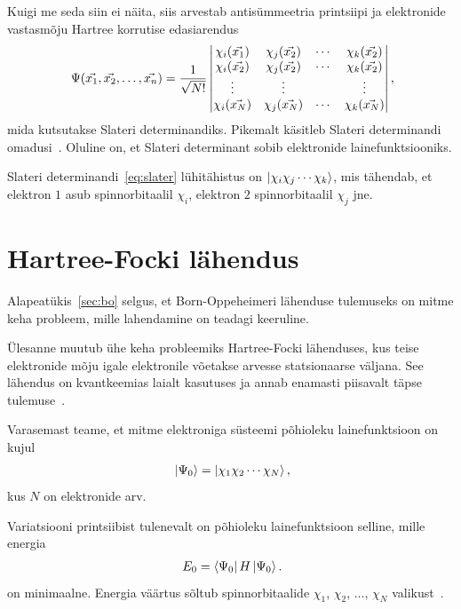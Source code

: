 \documentclass[12pt]{report}
\def\ket#1{\mathinner{|#1\rangle}}
\def\bra#1{\mathinner{\langle#1|}}
\begin{document}
Kuigi me seda siin ei näita, siis arvestab antisümmeetria printsiipi ja elektronide vastasmõju Hartree korrutise edasiarendus
\begin{align}\label{eq:slater}
    \Psi(\vec{x_1}, \vec{x_2}, \ldots, \vec{x_n})
    = \frac{1}{\sqrt{N!}} \begin{vmatrix}
        \chi_i(\vec{x_1}) & \chi_j(\vec{x_2}) & \cdots & \chi_k(\vec{x_2}) \\
        \chi_i(\vec{x_2}) & \chi_j(\vec{x_2}) & \cdots & \chi_k(\vec{x_2}) \\
        \vdots & \vdots & & \vdots \\
        \chi_i(\vec{x_N}) & \chi_j(\vec{x_N}) & \cdots & \chi_k(\vec{x_N}) \\
    \end{vmatrix} \rlap{,}
\end{align}
mida kutsutakse Slateri determinandiks.
Pikemalt käsitleb Slateri determinandi omadusi~\cite{szabo+ostlund}.
Oluline on, et Slateri determinant sobib elektronide lainefunktsiooniks.

Slateri determinandi~\eqref{eq:slater} lühitähistus on \(\ket{\chi_i\chi_j\cdots\chi_k}\), mis tähendab, et elektron \(1\) asub spinnorbitaalil \(\chi_i\), elektron \(2\) spinnorbitaalil \(\chi_j\) jne.

\section{Hartree-Focki lähendus}\label{sec:hf}

Alapeatükis~\ref{sec:bo} selgus, et Born-Oppeheimeri lähenduse tulemuseks on mitme keha probleem, mille lahendamine on teadagi keeruline.

Ülesanne muutub ühe keha probleemiks Hartree-Focki lähenduses, kus teise elektronide mõju igale elektronile võetakse arvesse statsionaarse väljana.
See lähendus on kvantkeemias laialt kasutuses ja annab enamasti piisavalt täpse tulemuse~\cite{szabo+ostlund}.

Varasemast teame, et mitme elektroniga süsteemi põhioleku lainefunktsioon on kujul
\begin{align}
    \ket{\Psi_0} = \ket{\chi_1 \chi_2 \cdots \chi_N} \rlap{,}
\end{align}
kus \(N\) on elektronide arv.

Variatsiooni printsiibist tulenevalt on põhioleku lainefunktsioon selline, mille energia
\begin{align}
    E_0 = \bra{\Psi_0} H \ket{\Psi_0} \rlap{.}
\end{align}
on minimaalne.
Energia väärtus sõltub spinnorbitaalide \(\chi_1\), \(\chi_2\), \(\ldots\), \(\chi_N\) valikust~\cite{szabo+ostlund}.
\end{document}
